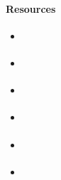 \paragraph{Resources}

\begin{itemize}
\item {} \cite{Jacobs1997ATO}
\item {} \cite{2017intro_coalgebra}
\item {} \cite{sangiorgi2011introduction}
\item {} \cite{sangiorgi2011advanced}
\item {} \cite{Gordon94atutorial}
\item {} \cite{rutten_uni_coalgebra}
\end{itemize}

